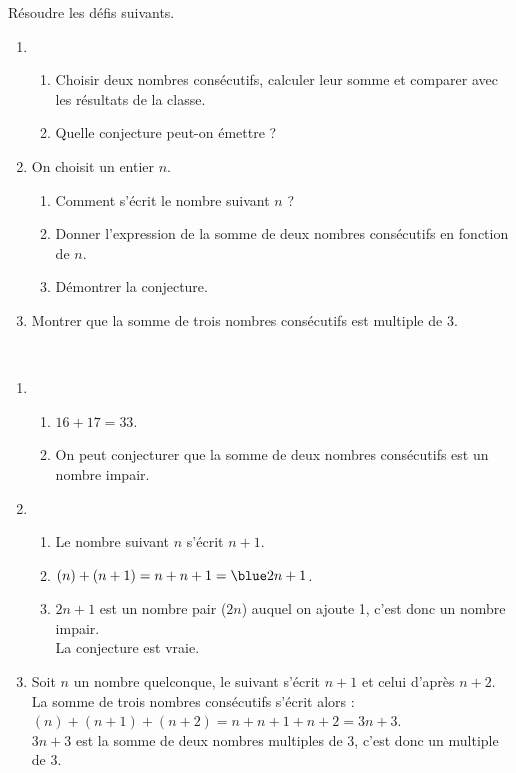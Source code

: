 \begin{colonne*exercice}
\begin{exercice} %
   Résoudre les défis suivants.
   \begin{enumerate}
      \item
         \begin{enumerate}
            \item Choisir deux nombres consécutifs, calculer leur somme et comparer avec les résultats de la classe.
            \item Quelle conjecture peut-on émettre ?
         \end{enumerate}
      \item On choisit un entier $n$.
         \begin{enumerate}
            \item Comment s'écrit le nombre suivant $n$ ?
            \item Donner l'expression de la somme de deux nombres consécutifs en fonction de $n$.
            \item Démontrer la conjecture.
         \end{enumerate}
      \item Montrer que la somme de trois nombres consécutifs est multiple de 3.
   \end{enumerate}
\end{exercice}

\begin{corrige}
\ \\ [-5mm]
   \begin{enumerate}
      \item
         \begin{enumerate}
            \item {\blue $16+17 =33$}.
            \item On peut conjecturer que  {\blue la somme de deux nombres consécutifs est un nombre impair}.
         \end{enumerate}
      \setcounter{enumi}{1}
      \item
         \begin{enumerate}
            \item Le nombre suivant $n$ s'écrit {\blue $n+1$}.
            \item $(n)+(n+1) =n+n+1 ={\blue 2n+1}$.
            \item $2n+1$ est un nombre pair ($2n$) auquel on ajoute 1, c'est donc un nombre impair. \\
               {\blue La conjecture est vraie}.
         \end{enumerate}
      \setcounter{enumi}{2}
      \item Soit $n$ un nombre quelconque, le suivant s'écrit $n+1$ et celui d'après $n+2$. \\
         La somme de trois nombres consécutifs s'écrit alors : \\
         $(n)+(n+1)+(n+2) =n+n+1+n+2 =3n+3$. \\
         $3n+3$ est la somme de deux nombres multiples de 3, {\blue c'est donc un multiple de 3}.
   \end{enumerate}
\end{corrige}
   

\end{colonne*exercice}

